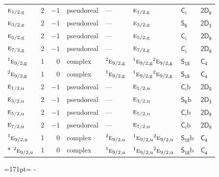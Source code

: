\documentclass[10pt,a4paper]{article}
\makeatletter
\def\grouprule#1#2{\noalign{\marks\LTgroupmarks{\the\belowrulesep}\nobreak\vskip#1%
  \vskip\aboverulesep}\multispan\LT@cols\unskip{\leaders\hrule\@height#2\hfill\kern\z@}\cr
  \noalign{\penalty\LTrulebreak\vskip\belowrulesep\global\@lastruleclass\z@}}
\newcommand{\needspace}[1]{\par\penalty-100\begingroup\dimen0=#1\relax\dimen2=\pagegoal
  \advance\dimen2-\pagetotal\ifdim\dimen0>\dimen2\relax\ifdim\dimen2>0pt\vfil\break\fi\fi
  \endgroup}
\numberwithin{equation}{section}
\newcommand{\grp}[1]{\mathsf{#1}}
\newcommand{\irr}[1]{\text{\normalfont\scshape #1}}
\newcommand{\conjpair}[1]{{}^{#1}}
\newcommand{\ptag}[1]{\mathrm{#1}}
\newcommand{\secondclass}{\mathrm{b}}
\makeatother
\begin{document}
{\begin{longtable}{@{}lrrlllll@{}}
\grouprule{0pt}{\lightrulewidth}
$\irr{e}_{1/2,\ptag{g}}$ & 2 & $-1$ & pseudoreal & --- & $\irr{e}_{1/2,\ptag{g}}$ & \href{S2.pdf}{$\grp{C_{i}}$} & \href{2D9.pdf}{$\grp{2D_{9}}$}\\
$\irr{e}_{3/2,\ptag{g}}$ & 2 & $-1$ & pseudoreal & --- & $\irr{e}_{3/2,\ptag{g}}$ & \href{S6.pdf}{$\grp{S_{6}}$} & \href{2D3.pdf}{$\grp{2D_{3}}$}\\
$\irr{e}_{5/2,\ptag{g}}$ & 2 & $-1$ & pseudoreal & --- & $\irr{e}_{5/2,\ptag{g}}$ & \href{S2.pdf}{$\grp{C_{i}}$} & \href{2D9.pdf}{$\grp{2D_{9}}$}\\
$\irr{e}_{7/2,\ptag{g}}$ & 2 & $-1$ & pseudoreal & --- & $\irr{e}_{7/2,\ptag{g}}$ & \href{S2.pdf}{$\grp{C_{i}}$} & \href{2D9.pdf}{$\grp{2D_{9}}$}\\
$\conjpair{1}\irr{e}_{9/2,\ptag{g}}$ & 1 & $0$ & complex & $\conjpair{2}\irr{e}_{9/2,\ptag{g}}$ & $\conjpair{1}\irr{e}_{9/2,\ptag{g}}\conjpair{2}\irr{e}_{9/2,\ptag{g}}$ & \href{S18.pdf}{$\grp{S_{18}}$} & \href{../../../rotation/data/pdf/C4.pdf}{$\grp{C_{4}}$}\\
$\conjpair{2}\irr{e}_{9/2,\ptag{g}}$ & 1 & $0$ & complex & $\conjpair{1}\irr{e}_{9/2,\ptag{g}}$ & $\conjpair{1}\irr{e}_{9/2,\ptag{g}}\conjpair{2}\irr{e}_{9/2,\ptag{g}}$ & \href{S18.pdf}{$\grp{S_{18}}$} & \href{../../../rotation/data/pdf/C4.pdf}{$\grp{C_{4}}$}\\
$\irr{e}_{1/2,\ptag{u}}$ & 2 & $-1$ & pseudoreal & --- & $\irr{e}_{1/2,\ptag{u}}$ & \href{S2b.pdf}{$\grp{C_{i}}\secondclass$} & \href{2D9.pdf}{$\grp{2D_{9}}$}\\
$\irr{e}_{3/2,\ptag{u}}$ & 2 & $-1$ & pseudoreal & --- & $\irr{e}_{3/2,\ptag{u}}$ & \href{S6b.pdf}{$\grp{S_{6}}\secondclass$} & \href{2D3.pdf}{$\grp{2D_{3}}$}\\
$\irr{e}_{5/2,\ptag{u}}$ & 2 & $-1$ & pseudoreal & --- & $\irr{e}_{5/2,\ptag{u}}$ & \href{S2b.pdf}{$\grp{C_{i}}\secondclass$} & \href{2D9.pdf}{$\grp{2D_{9}}$}\\
$\irr{e}_{7/2,\ptag{u}}$ & 2 & $-1$ & pseudoreal & --- & $\irr{e}_{7/2,\ptag{u}}$ & \href{S2b.pdf}{$\grp{C_{i}}\secondclass$} & \href{2D9.pdf}{$\grp{2D_{9}}$}\\
$\conjpair{1}\irr{e}_{9/2,\ptag{u}}$ & 1 & $0$ & complex & $\conjpair{2}\irr{e}_{9/2,\ptag{u}}$ & $\conjpair{1}\irr{e}_{9/2,\ptag{u}}\conjpair{2}\irr{e}_{9/2,\ptag{u}}$ & \href{S18b.pdf}{$\grp{S_{18}}\secondclass$} & \href{../../../rotation/data/pdf/C4.pdf}{$\grp{C_{4}}$}\\*
$\conjpair{2}\irr{e}_{9/2,\ptag{u}}$ & 1 & $0$ & complex & $\conjpair{1}\irr{e}_{9/2,\ptag{u}}$ & $\conjpair{1}\irr{e}_{9/2,\ptag{u}}\conjpair{2}\irr{e}_{9/2,\ptag{u}}$ & \href{S18b.pdf}{$\grp{S_{18}}\secondclass$} & \href{../../../rotation/data/pdf/C4.pdf}{$\grp{C_{4}}$}\\
\bottomrule\end{longtable}}
\needspace{171pt}
\end{document}
